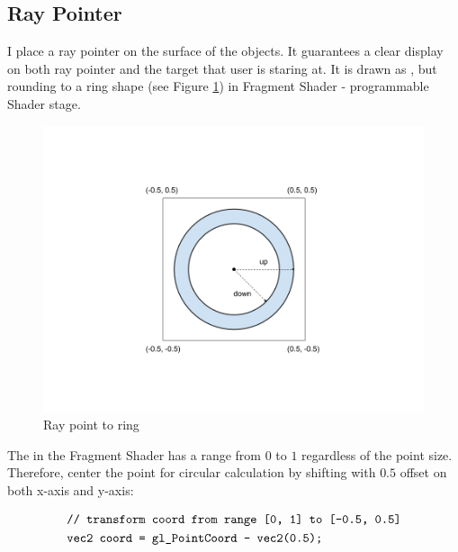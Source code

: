 \subsection{Ray Pointer}
\label{section:ray-pointer}

I place a ray pointer on the surface of the objects. It guarantees a clear display on both ray pointer and the target that user is staring at. It is drawn as , but rounding to a ring shape (see Figure \ref{fig:ray-point2ring}) in Fragment Shader \cite{wiki.fragment-shader.2016} - programmable Shader stage.

\begin{figure}[H]
\caption{Ray point to ring}
\label{fig:ray-point2ring}
\centering
\includegraphics[width=\textwidth, keepaspectratio]{Figures/ray-point2ring.png}
\decoRule
\end{figure}

The  in the Fragment Shader has a range from $0$ to $1$ regardless of the point size. Therefore, center the point for circular calculation by shifting with $0.5$ offset on both x-axis and y-axis:

\[
\begin{array}{lr}
\begin{aligned}
&\texttt{// transform coord from range [0, 1] to [-0.5, 0.5]}\\
&\texttt{vec2 coord = gl\_PointCoord - vec2(0.5);}\\
\end{aligned}
\end{array}
\]

